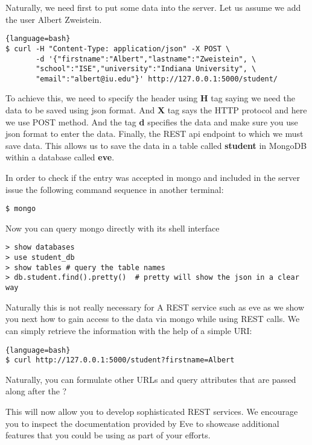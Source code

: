 Naturally, we need first to put some data into the server. Let us assume
we add the user Albert Zweistein.

\begin{lstlisting}{language=bash}
$ curl -H "Content-Type: application/json" -X POST \
       -d '{"firstname":"Albert","lastname":"Zweistein", \
       "school":"ISE","university":"Indiana University", \
       "email":"albert@iu.edu"}' http://127.0.0.1:5000/student/
\end{lstlisting}

To achieve this, we need to specify the header using \textbf{H} tag
saying we need the data to be saved using json format. And \textbf{X}
tag says the HTTP protocol and here we use POST method. And the tag
\textbf{d} specifies the data and make sure you use json format to
enter the data. Finally, the REST api endpoint to which we must save
data. This allows us to save the data in a table called
\textbf{student} in MongoDB within a database called \textbf{eve}.

In order to check if the entry was accepted in mongo and included in the
server issue the following command sequence in another terminal:

\begin{lstlisting}
$ mongo
\end{lstlisting}

Now you can query mongo directly with its shell interface

\begin{lstlisting}
> show databases
> use student_db  
> show tables # query the table names
> db.student.find().pretty()  # pretty will show the json in a clear way
\end{lstlisting}

Naturally this is not really necessary for A REST service such as eve
as we show you next how to gain access to the data via mongo while
using REST calls. We can simply retrieve
the information with the help of a simple URI:


\begin{lstlisting}{language=bash}
$ curl http://127.0.0.1:5000/student?firstname=Albert
\end{lstlisting}

Naturally, you can formulate other URLs and query attributes that are
passed along after the ? 

This will now allow you to develop sophisticated REST services. We
encourage you to inspect the documentation provided by Eve to showcase
additional features that you could be using as part of your efforts.

